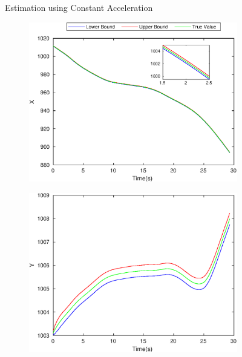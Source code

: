 \begin{figure}[!h]
\begin{subfigure}{.5\linewidth}
\end{subfigure}
\caption{Estimation using Constant Acceleration}
\end{figure}

\begin{figure}[h]
\begin{subfigure}{.5\linewidth}
\centering
\includegraphics[width=\linewidth]{figures/Frad/s3csSMX}
\end{subfigure}
\begin{subfigure}{.5\linewidth}
\centering
\includegraphics[width=\linewidth]{figures/Frad/s3csSMY}
\end{subfigure}
\begin{subfigure}{.5\linewidth}

\end{subfigure}
\end{figure}
